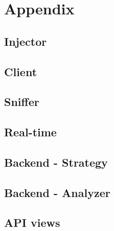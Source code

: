 \chapter{Appendix}\label{appendix}

\section{Injector}\label{sec:inject.sh}


\section{Client}\label{sec:breach.jsx}


\section{Sniffer}\label{sec:sniffer.py}


\section{Real-time}\label{sec:index.js}


\section{Backend - Strategy}\label{sec:strategy.py}


\section{Backend - Analyzer}\label{sec:analyzer.py}


\section{API views}\label{sec:views.py}


